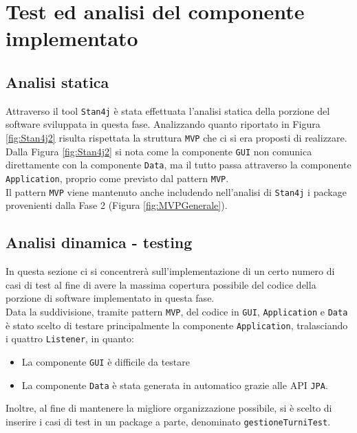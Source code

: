 \chapter{Test ed analisi del componente implementato}
\section{Analisi statica}
Attraverso il tool \verb|Stan4j| è stata effettuata l'analisi statica della porzione del software sviluppata in questa fase.
Analizzando quanto riportato in Figura \ref{fig:Stan4j2} risulta rispettata la struttura \verb|MVP| che ci si era proposti di realizzare.
Dalla Figura \ref{fig:Stan4j2} si nota come la componente \verb|GUI| non comunica direttamente con la componente \verb|Data|, ma il tutto passa attraverso la componente \verb|Application|, proprio come previsto dal pattern \verb|MVP|.\\

\noindent
Il pattern \verb|MVP| viene mantenuto anche includendo nell'analisi di \verb|Stan4j| i package provenienti dalla Fase 2 (Figura \ref{fig:MVPGenerale}).
\section{Analisi dinamica - testing}
In questa sezione ci si concentrerà sull'implementazione di un certo numero di casi di test al fine di avere la massima copertura possibile del codice della porzione di software implementato in questa fase.\\

\noindent
Data la suddivisione, tramite pattern \verb|MVP|, del codice in \verb|GUI|, \verb|Application| e \verb|Data| è stato scelto di testare principalmente la componente \verb|Application|,  tralasciando i quattro \verb|Listener|, in quanto:
\begin{itemize}
	\item La componente \verb|GUI| è difficile da testare
	\item La componente \verb|Data| è stata generata in automatico grazie alle API \verb|JPA|.
\end{itemize}
Inoltre, al fine di mantenere la migliore organizzazione possibile, si è scelto di inserire i casi di test in un package a parte, denominato \verb|gestioneTurniTest|.

